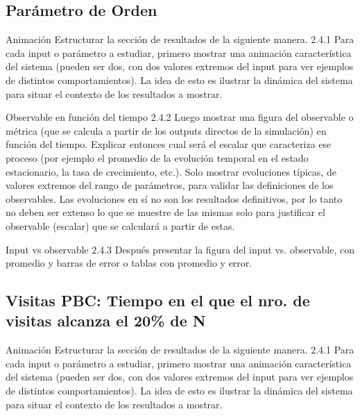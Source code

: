 \documentclass{beamer}
\begin{document}
    \subsection[Parámetro de Orden]{Parámetro de Orden}

    \begin{frame}{Animación}
        Estructurar la sección de resultados de la siguiente manera.
        2.4.1 Para cada input o parámetro a estudiar, primero mostrar una animación característica del
        sistema (pueden ser dos, con dos valores extremos del input para ver ejemplos de distintos
        comportamientos). La idea de esto es ilustrar la dinámica del sistema para situar el contexto de los
        resultados a mostrar.
    \end{frame}

    \begin{frame}{Observable en función del tiempo}
        2.4.2 Luego mostrar una figura del observable o métrica (que se calcula a partir de los outputs
        directos de la simulación) en función del tiempo. Explicar entonces cual será el escalar que
        caracteriza ese proceso (por ejemplo el promedio de la evolución temporal en el estado
        estacionario, la tasa de crecimiento, etc.). Solo mostrar evoluciones típicas, de valores extremos
        del rango de parámetros, para validar las definiciones de los observables. Las evoluciones en sí
        no son los resultados definitivos, por lo tanto no deben ser extenso lo que se muestre de las
        mismas solo para justificar el observable (escalar) que se calculará a partir de estas.
    \end{frame}

    \begin{frame}{Input vs observable}
        2.4.3 Después presentar la figura del input vs. observable, con promedio y barras de error o tablas
        con promedio y error.
    \end{frame}

    \subsection[Visitas PBC]{Visitas PBC: Tiempo en el que el nro. de visitas alcanza el 20\% de N}

    \begin{frame}{Animación}
        Estructurar la sección de resultados de la siguiente manera.
        2.4.1 Para cada input o parámetro a estudiar, primero mostrar una animación característica del
        sistema (pueden ser dos, con dos valores extremos del input para ver ejemplos de distintos
        comportamientos). La idea de esto es ilustrar la dinámica del sistema para situar el contexto de los
        resultados a mostrar.
    \end{frame}
\end{document}
